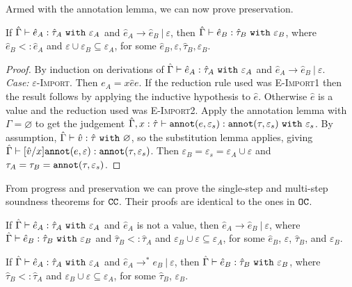 Armed with the annotation lemma, we can now prove preservation.


\begin{theorem}
If $\hat \Gamma \vdash \hat e_A: \hat \tau_A~\mathtt{with}~ \varepsilon_A$ and $\hat e_A \longrightarrow \hat e_B~|~\varepsilon$, then $\hat \Gamma \vdash \hat e_B: \hat \tau_B~\mathtt{with}~ \varepsilon_B$, where $\hat e_B <: \hat e_A$ and $\varepsilon \cup \varepsilon_B \subseteq \varepsilon_A$, for some $\hat e_B, \varepsilon, \hat \tau_B, \varepsilon_B$.
\end{theorem}

\begin{proof} By induction on derivations of $\hat \Gamma \vdash \hat e_A: \hat \tau_A~\mathtt{with}~ \varepsilon_A$ and $\hat e_A \longrightarrow \hat e_B~|~\varepsilon$. \\

\textit{Case:} \textsc{$\varepsilon$-Import}. Then $e_A = {x}{\hat e}{e}$. If the reduction rule used was \textsc{E-Import1} then the result follows by applying the inductive hypothesis to $\hat e$. Otherwise $\hat e$ is a value and the reduction used was \textsc{E-Import2}. Apply the annotation lemma with $\Gamma = \varnothing$ to get the judgement $\hat \Gamma, x: \hat \tau \vdash \mathtt{annot}(e, \varepsilon_s): \mathtt{annot}(\tau, \varepsilon_s)~\mathtt{with}~ \varepsilon_s$. By assumption, $\hat \Gamma \vdash \hat v: \hat \tau~\mathtt{with}~ \varnothing$, so the substitution lemma applies, giving $\hat \Gamma \vdash [\hat v/x]\mathtt{annot}(e, \varepsilon): \mathtt{annot}(\tau, \varepsilon_s)$. Then $\varepsilon_B = \varepsilon_s = \varepsilon_A \cup \varepsilon$ and $\tau_A = \tau_B = \mathtt{annot}(\tau, \varepsilon_s)$.
\end{proof}

From progress and preservation we can prove the single-step and multi-step soundness theorems for $\mathtt{CC}$. Their proofs are identical to the ones in $\mathtt{OC}$.

\begin{theorem}
If $\hat \Gamma \vdash \hat e_A: \hat \tau_A~\mathtt{with}~ \varepsilon_A$ and $\hat e_A$ is not a value, then $\hat e_A \longrightarrow \hat e_B~|~\varepsilon$, where $\hat \Gamma \vdash \hat e_B: \hat \tau_B~\mathtt{with}~ \varepsilon_B$ and $\hat \tau_B <: \hat \tau_A$ and $\varepsilon_B \cup \varepsilon \subseteq \varepsilon_A$, for some $\hat e_B$, $\varepsilon$, $\hat \tau_B$, and $\varepsilon_B$.
\end{theorem}

\begin{theorem}
If $\hat \Gamma \vdash \hat e_A: \hat \tau_A~\mathtt{with}~ \varepsilon_A$ and $\hat e_A \longrightarrow^{*} e_B~|~\varepsilon$, then $\hat \Gamma \vdash \hat e_B: \hat \tau_B~\mathtt{with}~ \varepsilon_B$, where $\hat \tau_B <: \hat \tau_A$ and $\varepsilon_B \cup \varepsilon \subseteq \varepsilon_A$, for some $\hat \tau_B$, $\varepsilon_B$.
\end{theorem}








